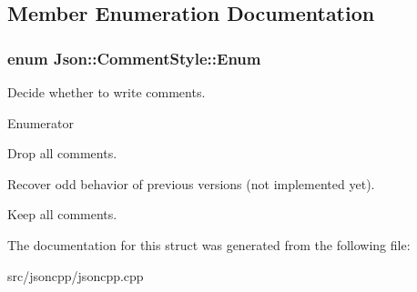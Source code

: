 \subsection{Member Enumeration Documentation}
\subsubsection[{\texorpdfstring{Enum}{Enum}}]{\setlength{\rightskip}{0pt plus 5cm}enum {\bf Json\+::\+Comment\+Style\+::\+Enum}}\hypertarget{structJson_1_1CommentStyle_a51fc08f3518fd81eba12f340d19a3d0c}{}\label{structJson_1_1CommentStyle_a51fc08f3518fd81eba12f340d19a3d0c}


Decide whether to write comments. 

\begin{Desc}
\item[Enumerator]\par
\begin{description}
\item[{\em 
None\hypertarget{structJson_1_1CommentStyle_a51fc08f3518fd81eba12f340d19a3d0cac8b32a8bae63414c8647d4919da8d437}{}\label{structJson_1_1CommentStyle_a51fc08f3518fd81eba12f340d19a3d0cac8b32a8bae63414c8647d4919da8d437}
}]Drop all comments. \item[{\em 
Most\hypertarget{structJson_1_1CommentStyle_a51fc08f3518fd81eba12f340d19a3d0cac65238f050773c107690a456e9c05c98}{}\label{structJson_1_1CommentStyle_a51fc08f3518fd81eba12f340d19a3d0cac65238f050773c107690a456e9c05c98}
}]Recover odd behavior of previous versions (not implemented yet). \item[{\em 
All\hypertarget{structJson_1_1CommentStyle_a51fc08f3518fd81eba12f340d19a3d0ca32302c0b97190c1808b3e38f367fef01}{}\label{structJson_1_1CommentStyle_a51fc08f3518fd81eba12f340d19a3d0ca32302c0b97190c1808b3e38f367fef01}
}]Keep all comments. \end{description}
\end{Desc}


The documentation for this struct was generated from the following file\+:\begin{DoxyCompactItemize}
\item 
src/jsoncpp/jsoncpp.\+cpp\end{DoxyCompactItemize}
